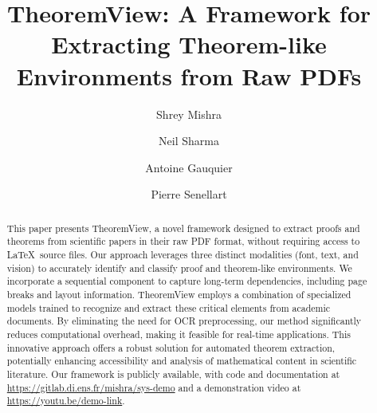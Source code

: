 \documentclass[runningheads]{llncs}
\begin{document}
%
\title{TheoremView: A Framework for Extracting Theorem-like Environments from Raw PDFs}
%
%
\author{Shrey Mishra \and
Neil Sharma \and
Antoine Gauquier \and
Pierre Senellart}



\maketitle              %
%
\begin{abstract}
This paper presents TheoremView, a novel framework designed 
to extract proofs and theorems from scientific papers in their raw PDF format, 
without requiring access to \LaTeX~source files. Our approach leverages three 
distinct modalities (font, text, and vision) to accurately identify and classify 
proof and theorem-like environments. We incorporate a sequential component to capture 
long-term dependencies, including page breaks and layout information. 
TheoremView employs a combination of specialized models trained to recognize 
and extract these critical elements from academic documents. By eliminating 
the need for OCR preprocessing, our method significantly reduces computational 
overhead, making it feasible for real-time applications. This innovative 
approach offers a robust solution for automated theorem extraction, potentially 
enhancing accessibility and analysis of mathematical content in scientific 
literature. Our framework is publicly available, with code and documentation at \url{https://gitlab.di.ens.fr/mishra/sys-demo} and a demonstration video at \url{https://youtu.be/demo-link}.


\end{abstract}
\end{document}
